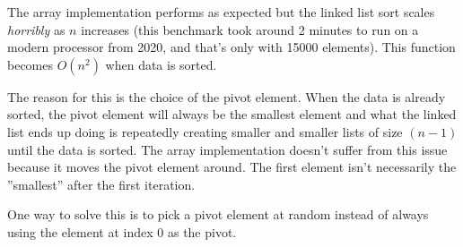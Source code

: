 \documentclass[a4paper,11pt]{article}
\begin{document}
The array implementation performs as expected but the linked list sort scales \emph{horribly} as $n$ increases (this benchmark took around 2 minutes to run on a modern processor from 2020, and that's only with 15000 elements).
This function becomes $O(n^2)$ when data is sorted.

The reason for this is the choice of the pivot element.
When the data is already sorted,
the pivot element will always be the smallest element and what the linked list ends up doing is repeatedly creating smaller and smaller lists of size $(n - 1)$ until the data is sorted.
The array implementation doesn't suffer from this issue because it moves the pivot element around. The first element isn't necessarily the ''smallest'' after the first iteration.

One way to solve this is to pick a pivot element at random instead of always using the element at index $0$ as the pivot.
\end{document}
